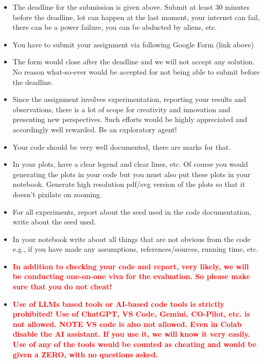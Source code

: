 \documentclass[a4 paper]{article}
\numberwithin{equation}{section}
\newcommand{\0}{\mathbf{0}}
\begin{document}
\begin{itemize}
      \item The deadline for the submission is given above. Submit at least 30 minutes before the deadline, lot can happen at the last moment, your internet can fail, there can be a power failure, you can be abducted by aliens, etc. 
   \item You have to submit your assignment via following Google Form (link above) 
   \item The form would close after the deadline and we will not accept any solution. No reason what-so-ever would be accepted for not being able to submit before the deadline. 
   \item Since the assignment involves experimentation, reporting your results and observations, there is a lot of scope for creativity and innovation and presenting new perspectives. Such efforts would be highly appreciated and accordingly well rewarded. Be an exploratory agent! 
   \item Your code should be very well documented, there are marks for that. 
   \item  In your plots, have a clear legend and clear lines, etc. Of course you would generating the plots in your code but you must also put these plots in your notebook. Generate high resolution pdf/svg version of the plots so that it doesn't pixilate on zooming.
  \item For all experiments, report about the seed used in the code documentation, write about the seed used.
  \item In your notebook write about all things that are not obvious from the code e.g., if you have made any assumptions, references/sources, running time, etc. 
    \item \textcolor{red}{\textbf{In addition to checking your code and report, very likely, we will be conducting one-on-one viva for the evaluation. So please make sure that you do not cheat! }}
   \item \textcolor{red}{\textbf{Use of LLMs based tools or AI-based code tools is strictly prohibited! Use of ChatGPT, VS Code, Gemini, CO-Pilot, etc. is not allowed. NOTE VS code is also not allowed. Even in Colab disable the AI assistant. If you use it, we will know it very easily. Use of any of the tools would be counted as cheating and would be given a ZERO, with no questions asked.}}
\end{itemize}
\end{document}
